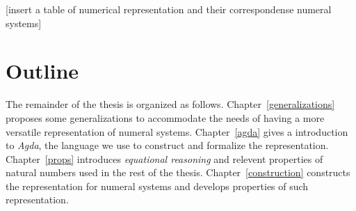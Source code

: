 \documentclass[../thesis.tex]{subfiles}
\begin{document}
[insert a table of numerical representation and their correspondense numeral systems]

\section{Outline}
The remainder of the thesis is organized as follows.
Chapter~\ref{generalizations} proposes some generalizations to accommodate the
needs of having a more versatile representation of numeral systems.
Chapter~\ref{agda} gives a introduction to \textit{Agda}, the language we use to
construct and formalize the representation.
Chapter~\ref{props} introduces \textit{equational reasoning} and relevent properties
of natural numbers used in the rest of the thesis.
Chapter~\ref{construction} constructs the representation for numeral systems and
develops properties of such representation.


\end{document}

